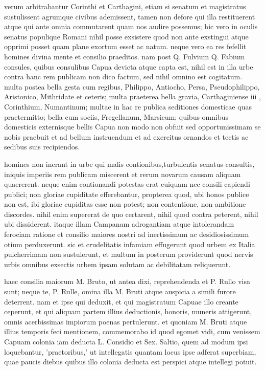 verum arbitrabantur Corinthi et Carthagini, etiam si senatum et magistratus sustulissent agrumque civibus ademissent, tamen non defore qui illa restituerent atque qui ante omnia commutarent quam nos audire possemus; hic vero in oculis senatus populique Romani nihil posse exsistere quod non ante exstingui atque opprimi posset quam plane exortum esset ac natum. neque vero ea res fefellit homines divina mente et consilio praeditos. nam post Q. Fulvium Q. Fabium consules, quibus consulibus Capua devicta atque capta est, nihil est in illa urbe contra hanc rem publicam non dico factum, sed nihil omnino est cogitatum. multa postea bella gesta cum regibus, Philippo, Antiocho, Persa, Pseudophilippo, Aristonico, Mithridate et ceteris; multa praeterea bella gravia, Carthaginiense iii , Corinthium, Numantinum; multae in hac re publica seditiones domesticae quas praetermitto; bella cum sociis, Fregellanum, Marsicum; quibus omnibus domesticis externisque bellis Capua non modo non obfuit sed opportunissimam se nobis praebuit et ad bellum instruendum et ad exercitus ornandos et tectis ac sedibus suis recipiendos.

 homines non inerant in urbe qui malis contionibus,turbulentis senatus consultis, iniquis imperiis rem publicam miscerent et rerum novarum causam aliquam quaererent. neque enim contionandi potestas erat cuiquam nec consili capiendi publici; non gloriae cupiditate efferebantur, propterea quod, ubi honos publice non est, ibi gloriae cupiditas esse non potest; non contentione, non ambitione discordes. nihil enim supererat de quo certarent, nihil quod contra peterent, nihil ubi dissiderent. itaque illam Campanam adrogantiam atque intolerandam ferociam ratione et consilio maiores nostri ad inertissimum ac desidiosissimum otium perduxerunt. sic et crudelitatis infamiam effugerunt quod urbem ex Italia pulcherrimam non sustulerunt, et multum in posterum providerunt quod nervis urbis omnibus exsectis urbem ipsam solutam ac debilitatam reliquerunt.

 haec consilia maiorum M. Bruto, ut antea dixi, reprehendenda et P. Rullo visa sunt; neque te, P. Rulle, omina illa M. Bruti atque auspicia a simili furore deterrent. nam et ipse qui deduxit, et qui magistratum Capuae illo creante ceperunt, et qui aliquam partem illius deductionis, honoris, muneris attigerunt, omnis acerbissimas impiorum poenas pertulerunt. et quoniam M. Bruti atque illius temporis feci mentionem, commemorabo id quod egomet vidi, cum venissem Capuam colonia iam deducta L. Considio et Sex. Saltio, quem ad modum ipsi loquebantur, 'praetoribus,' ut intellegatis quantam locus ipse adferat superbiam, quae paucis diebus quibus illo colonia deducta est perspici atque intellegi potuit.

